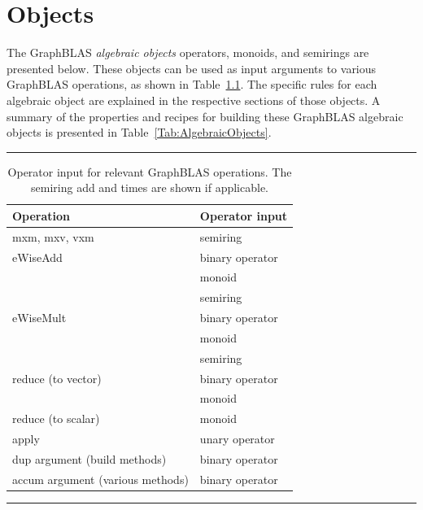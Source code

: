 \chapter{Objects}
\label{Chp:Objects}

The GraphBLAS \emph{algebraic objects} operators, monoids, and semirings
are presented below.
These objects can be used as input arguments to various GraphBLAS
operations, as shown in Table~\ref{Tab:OperatorInputType}.
The specific rules for each algebraic object
are explained in the respective sections of those objects.  A summary
of the properties and recipes for building these GraphBLAS algebraic
objects is presented in Table~\ref{Tab:AlgebraicObjects}.

\begin{table}
    \hrule
    \begin{center}
        \caption{Operator input for relevant GraphBLAS operations. 
        The semiring add and times are shown if applicable.}
        \label{Tab:OperatorInputType}
        \begin{tabular}{l|l}
        Operation           			& Operator input  	\\ \hline
        {\sf mxm, mxv, vxm} 			& semiring 		\\ \hline
        {\sf eWiseAdd}      			& binary operator   	\\
                            			& monoid           	\\
                            			& semiring          	\\ \hline
        {\sf eWiseMult}     			& binary operator   	\\
                            			& monoid          	\\
                            			& semiring         	\\ \hline
       {\sf reduce} (to vector)  		& binary operator	\\ 
                            			& monoid           	\\ \hline
       {\sf reduce} (to scalar)  		& monoid           	\\ \hline
       {\sf apply}         			    & unary operator   	\\ \hline
       {\sf dup} argument (build methods)  	& binary operator   	\\ \hline
       {\sf accum} argument (various methods) 	& binary operator  	\\
       \end{tabular}
    \end{center}
    \hrule
\end{table}

